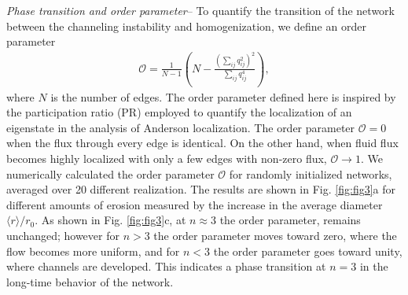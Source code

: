 \documentclass[%
reprint,
 amsmath,amssymb,
 aps,
prl,
]{revtex4-1}
\begin{document}
\textit{Phase transition and order parameter}-- {To quantify the transition of the network between the channeling instability and homogenization, we define an order parameter %
%
\begin{align}
\mathcal{O} = \frac{1}{N-1} \left( N - \frac{\left( \sum_{ij} q^2_{ij}\right)^2}{ \sum_{ij} q^4_{ij}}\right),
\end{align}
%
where $N$ is the number of edges.} {The order parameter defined here is inspired by the participation ratio (PR) employed to quantify the localization of an eigenstate in the analysis of Anderson localization\cite{kramer1993localization}.}  The order parameter $\mathcal{O}=0 $ when the flux through every edge is identical. On the other hand, when fluid flux becomes highly localized with only a few edges with non-zero flux, $\mathcal{O}\to 1$.  We numerically calculated the  order parameter $\mathcal{O}$ for {randomly initialized networks, averaged over 20 different realization}. 
The results are shown in Fig. \ref{fig:fig3}a for different amounts of erosion measured by the increase in the average diameter $\langle r\rangle /r_0$. As shown in 
 Fig. \ref{fig:fig3}c, at $n\approx 3$ the order parameter, remains unchanged; however for $n>3$ the order parameter moves toward zero, where the flow becomes more uniform, and for $n<3$ the order parameter goes toward unity, where channels are developed. This indicates a phase transition at $n=3$ in the long-time behavior of the network.
%
\end{document}
